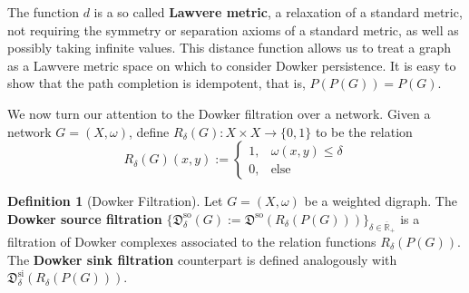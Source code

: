 \documentclass[pdflatex,bst/sn-mathphys-num]{sn-jnl}%
\newcommand{\miguel}[1] {{\textcolor{brown}{{\sf Miguel: } #1}}}
\newcommand{\posR}{\overline{\mathbb{R}}_+}
\theoremstyle{thmstyleone}%
\theoremstyle{definition}
\theoremstyle{thmstyletwo}%
\newcommand{\FD}{\mathfrak{D}}
\theoremstyle{thmstylethree}%
\newtheorem{definition}{Definition}%
\begin{document}
The function $d$ is a so called \textbf{Lawvere metric}, a relaxation of a standard metric, not requiring the symmetry or separation axioms of a standard metric, as well as possibly taking infinite values. This distance function allows us to treat a graph as a Lawvere metric space on which to consider Dowker persistence. It is easy to show that the path completion is idempotent, that is, $P(P(G))=P(G)$.

We now turn our attention to the Dowker filtration over a network. Given a network $G=(X,\omega)$, define $R_\delta(G) : X \times X \to \{0, 1\}$ to be the relation
\begin{equation}
        R_\delta(G)(x,y) := 
        \begin{cases}
            1, & \omega(x,y) \leq \delta \\
            0, & \text{else}
        \end{cases}
\end{equation}


\begin{definition}[Dowker Filtration]
    Let $G = (X, \omega)$ be a weighted digraph. The \textbf{Dowker source filtration} $\{\FD^\text{so}_\delta(G):=\FD^\text{so}(R_\delta(P(G))) \}_{\delta \in \posR}$ is a filtration of Dowker complexes associated to the relation functions $R_\delta(P(G))$. The \textbf{Dowker sink filtration} counterpart is defined analogously with $\FD_\delta^\text{si}(R_\delta(P(G)))$.
\end{definition}
\end{document}
